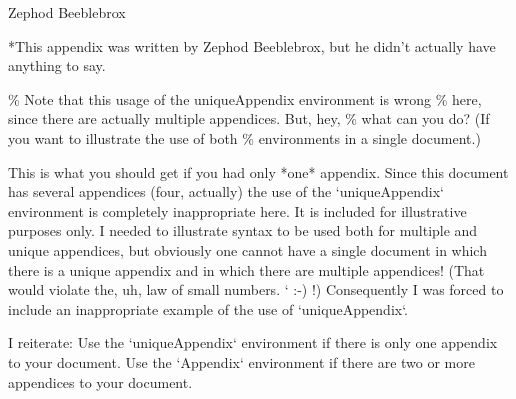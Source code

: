 \documentclass[
  times,
  doublespace]{anzsauth}
\begin{document}
\begin{Appendix}
\label{app:zephod}
\begin{center}
Zephod Beeblebrox
\end{center}

*This appendix was written by Zephod Beeblebrox, but he didn't
actually have anything to say. \lipsum[3]
\end{Appendix}

\% Note that this usage of the uniqueAppendix environment is wrong \%
here, since there are actually multiple appendices. But, hey, \% what
can you do? (If you want to illustrate the use of both \% environments
in a single document.)

\begin{uniqueAppendix}

This is what you should get if you had only *one* appendix.
Since this document has several appendices (four, actually) the
use of the `uniqueAppendix` environment is completely
inappropriate here.  It is included for illustrative purposes
only.  I needed to illustrate syntax to be used both for multiple
and unique appendices, but obviously one cannot have a single
document in which there is a unique appendix and in which there are
multiple appendices!  (That would violate the, uh, law of small
numbers. ` :-) !)  Consequently I was forced to include an
inappropriate example of the use of `uniqueAppendix`.

I reiterate:  Use the `uniqueAppendix` environment if there is
only one appendix to your document.  Use the `Appendix`
environment if there are two or more appendices to your document.

\end{uniqueAppendix}


  
\end{document}
